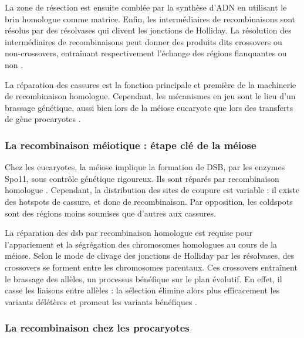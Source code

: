 \documentclass[11pt, oneside]{scrartcl}
\begin{document}
La zone de résection est ensuite comblée par la synthèse d'ADN en utilisant le
brin homologue comme matrice. Enfin, les intermédiaires de recombinaisons sont
résolus par des résolvases qui clivent les jonctions de Holliday. La résolution
des intermédiaires de recombinaisons peut donner des produits dits crossovers ou
non-crossovers, entraînant respectivement l'échange des régions flanquantes ou
non \cite{mancera_high-resolution_2008}.

\begin{transition}
La réparation des cassures est la fonction principale et première de la
machinerie de recombinaison homologue. Cependant, les mécanismes en jeu sont le
lieu d'un brassage génétique, aussi bien lors de la méiose eucaryote que lors
des transferts de gène procaryotes \cite{redfield_bacteria_2001}.
\end{transition}

\subsubsection{La recombinaison méiotique : étape clé de la méiose}
\label{sec:orgheadline3}

Chez les eucaryotes, la méiose implique la formation de DSB, par les enzymes
Spo11, sous contrôle génétique rigoureux. Ils sont réparés par recombinaison
homologue \cite{chapman_playing_2012}. Cependant, la distribution des sites de
coupure est variable : il existe des hotspots de cassure, et donc de
recombinaison. Par opposition, les coldspots sont des régions moins soumises que
d'autres aux cassures.

La réparation des \ac{dsb} par recombinaison homologue est requise pour
l'appariement et la ségrégation des chromosomes homologues au cours de la
méiose. Selon le mode de clivage des jonctions de Holliday par les résolvases,
des crossovers se forment entre les chromosomes parentaux. Ces crossovers
entraînent le brassage des allèles, un processus bénéfique sur le plan
évolutif\cite{webster_direct_2012}. En effet, il casse les liaisons entre
allèles : la sélection élimine alors plus efficacement les variants délétères et
promeut les variants bénéfiques \cite{otto_resolving_2002}.

\subsubsection{La recombinaison chez les procaryotes}
\label{sec:orgheadline4}
\end{document}
